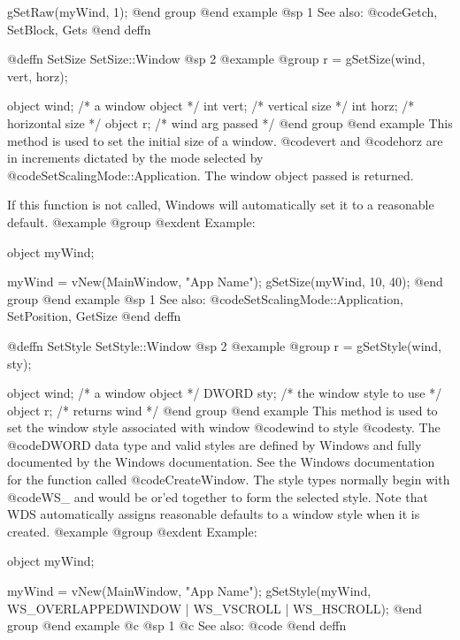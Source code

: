 gSetRaw(myWind, 1);
@end group
@end example
@sp 1
See also:  @code{Getch, SetBlock, Gets}
@end deffn











@deffn {SetSize} SetSize::Window
@sp 2
@example
@group
r = gSetSize(wind, vert, horz);

object  wind;   /*  a window object     */
int     vert;   /*  vertical size       */
int     horz;   /*  horizontal size     */
object  r;      /*  wind arg passed     */
@end group
@end example
This method is used to set the initial size of a window.
@code{vert} and @code{horz} are in increments dictated by the
mode selected by @code{SetScalingMode::Application}.  The window
object passed is returned.

If this function is not called, Windows will automatically set it to a
reasonable default.
@example
@group
@exdent Example:

object  myWind;

myWind = vNew(MainWindow, "App Name");
gSetSize(myWind, 10, 40);
@end group
@end example
@sp 1
See also:  @code{SetScalingMode::Application, SetPosition, GetSize}
@end deffn









@deffn {SetStyle} SetStyle::Window
@sp 2
@example
@group
r = gSetStyle(wind, sty);

object  wind;   /*  a window object             */
DWORD   sty;    /*  the window style to use     */
object  r;      /*  returns wind                */
@end group
@end example
This method is used to set the window style associated with window
@code{wind} to style @code{sty}.  The @code{DWORD} data type and valid 
styles are defined by Windows and fully documented by the Windows
documentation.  See the Windows documentation for the function called
@code{CreateWindow}.  The style types normally begin with @code{WS_}
and would be or'ed together to form the selected style.
Note that WDS automatically assigns reasonable defaults to a window
style when it is created.
@example
@group
@exdent Example:

object  myWind;

myWind = vNew(MainWindow, "App Name");
gSetStyle(myWind, WS_OVERLAPPEDWINDOW | WS_VSCROLL | WS_HSCROLL);
@end group
@end example
@c @sp 1
@c See also:  @code{}
@end deffn








